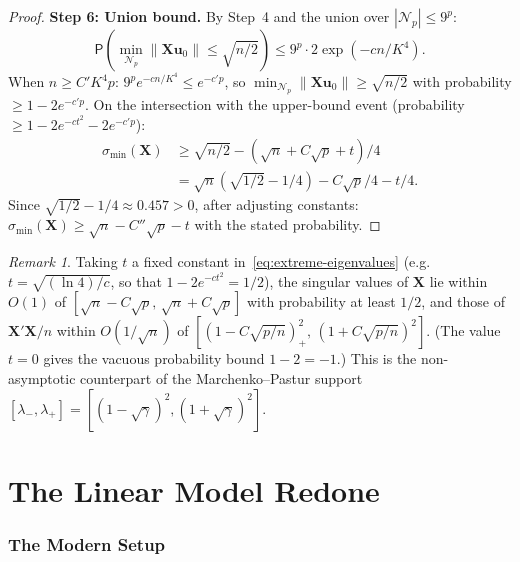\documentclass[14pt]{extarticle}
\theoremstyle{plain}
\theoremstyle{definition}
\theoremstyle{remark}
\newtheorem*{remark}{Remark}
\newcommand\prb{\mathsf{P}}
\newcommand{\bX}{\mathbf{X}}
\newcommand{\bu}{\mathbf{u}}
\newcommand{\calN}{\mathcal{N}}
\begin{document}
\begin{proof}
\textbf{Step 6: Union bound.} By Step~4 and the union over $|\calN_p| \leqslant 9^p$:
\[
\prb\!\left(\min_{\calN_p}\|\bX\bu_0\| \leqslant \sqrt{n/2}\right) \leqslant 9^p\cdot 2\exp(-cn/K^4).
\]
When $n \geqslant C'K^4 p$: $9^p e^{-cn/K^4} \leqslant e^{-c'p}$, so $\min_{\calN_p}\|\bX\bu_0\| \geqslant \sqrt{n/2}$ with probability $\geqslant 1 - 2e^{-c'p}$. On the intersection with the upper-bound event (probability $\geqslant 1 - 2e^{-ct^2} - 2e^{-c'p}$):
\begin{align*}
\sigma_{\min}(\bX) &\geqslant \sqrt{n/2} - (\sqrt{n} + C\sqrt{p} + t)/4\\
&= \sqrt{n}(\sqrt{1/2} - 1/4) - C\sqrt{p}/4 - t/4.
\end{align*}
Since $\sqrt{1/2} - 1/4 \approx 0.457 > 0$, after adjusting constants: $\sigma_{\min}(\bX) \geqslant \sqrt{n} - C''\sqrt{p} - t$ with the stated probability.
\end{proof}

\begin{remark}
Taking $t$ a fixed constant in~\eqref{eq:extreme-eigenvalues} (e.g.\ $t = \sqrt{(\ln 4)/c}$, so that $1 - 2e^{-ct^2} = 1/2$), the singular values of $\bX$ lie within $O(1)$ of $[\sqrt{n} - C\sqrt{p},\, \sqrt{n} + C\sqrt{p}]$ with probability at least $1/2$, and those of $\bX'\bX/n$ within $O(1/\sqrt{n})$ of $[(1 - C\sqrt{p/n})_+^2,\, (1 + C\sqrt{p/n})^2]$. (The value $t = 0$ gives the vacuous probability bound $1 - 2 = -1$.) This is the non-asymptotic counterpart of the Marchenko--Pastur support $[\lambda_-,\lambda_+] = [(1-\sqrt\gamma)^2, (1+\sqrt\gamma)^2]$.
\end{remark}

\newpage
\part{The Linear Model Redone}\label{part:linear-model}

\section{The Modern Setup}\label{sec:modern-setup}
\end{document}
